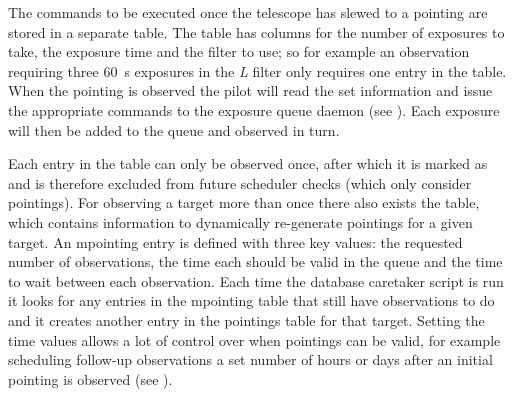 \begin{colsection}
The commands to be executed once the telescope has slewed to a pointing are stored in a separate  table. The table has columns for the number of exposures to take, the exposure time and the filter to use; so for example an observation requiring three \SI{60}{\second} exposures in the \textit{L} filter only requires one entry in the table. When the pointing is observed the pilot will read the set information and issue the appropriate commands to the exposure queue daemon (see ). Each exposure will then be added to the queue and observed in turn.

\newpage

Each entry in the  table can only be observed once, after which it is marked as  and is therefore excluded from future scheduler checks (which only consider  pointings). For observing a target more than once there also exists the  table, which contains information to dynamically re-generate pointings for a given target. An mpointing entry is defined with three key values: the requested number of observations, the time each should be valid in the queue and the time to wait between each observation. Each time the database caretaker script is run it looks for any entries in the mpointing table that still have observations to do and it creates another entry in the pointings table for that target. Setting the time values allows a lot of control over when pointings can be valid, for example scheduling follow-up observations a set number of hours or days after an initial pointing is observed (see ).


\end{colsection}
